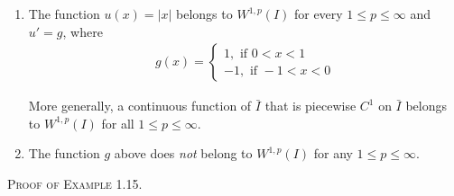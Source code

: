 \documentclass[a4paper,oneside]{article}
\numberwithin{equation}{section}
\begin{document}
\begin{enumerate}
\item The function $u\left( x \right) = \left| x \right|$ belongs to ${W^{1,p}}\left( I \right)$ for every $1\le p\le \infty$ and $u'=g$, where
\begin{align}
g\left( x \right) = \left\{ {\begin{array}{*{20}{c}}
{1,\mbox{ if } 0 < x < 1}\\
{ - 1,\mbox{ if } - 1 < x < 0}
\end{array}} \right.
\end{align}

More generally, a continuous function of $\bar{I}$ that is piecewise $C^1$ on $\bar{I}$ belongs to ${W^{1,p}}\left( I \right)$ for all $1\le p\le \infty$.
\item The function $g$ above does \textit{not} belong to ${W^{1,p}}\left( I \right)$ for any $1\le p \le \infty$.
\end{enumerate}
\textsc{Proof of Example 1.15.} 
\end{document}
